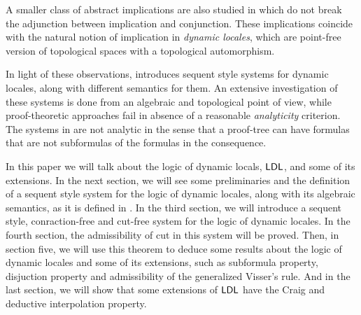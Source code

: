 A smaller class of abstract implications are also studied in \cite{amir} which do not break the adjunction between implication and conjunction. These implications coincide with the natural notion of implication in \emph{dynamic locales}, which are point-free version of topological spaces with a topological automorphism.

In light of these observations, \cite{amir} introduces sequent style systems for dynamic locales, along with different semantics for them. An extensive investigation of these systems is done from an algebraic and topological point of view, while proof-theoretic approaches fail in absence of a reasonable \emph{analyticity} criterion. The systems in \cite{amir} are not analytic in the sense that a proof-tree can have formulas that are not subformulas of the formulas in the consequence.

In this paper we will talk about the logic of dynamic locals, $\mathsf{LDL}$, and some of its extensions. In the next section, we will see some preliminaries and the definition of a sequent style system for the logic of dynamic locales, along with its algebraic semantics, as it is defined in \cite{amir}.
In the third section, we will introduce a sequent style, conraction-free and cut-free system for the logic of dynamic locales.
In the fourth section, the admissibility of cut in this system will be proved. Then, in section five, we will use this theorem to deduce some results about the logic of dynamic locales and some of its extensions, such as subformula property, disjuction property and admissibility of the generalized Visser's rule.
And in the last section, we will show that some extensions of $\mathsf{LDL}$ have the Craig and deductive interpolation property.